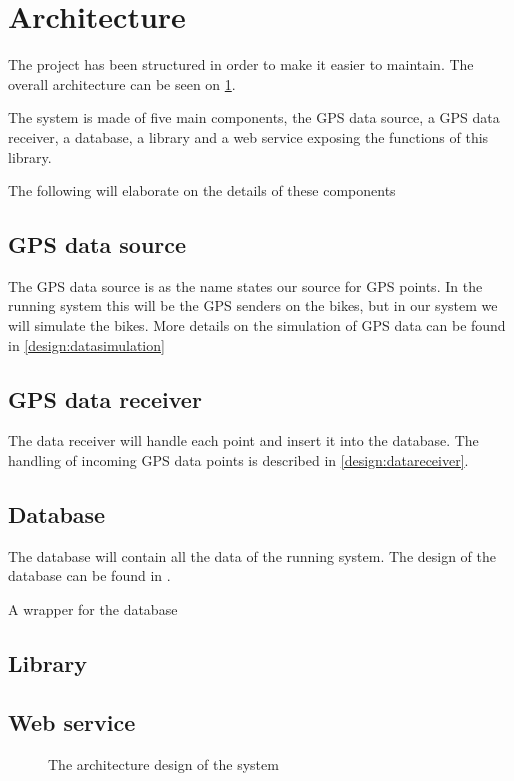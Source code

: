 \section{Architecture}

The project has been structured in order to make it easier to maintain. 
The overall architecture can be seen on \cref{arch}.

The system is made of five main components, the GPS data source, a GPS data receiver, a database, a library and a web service exposing the functions of this library.

The following will elaborate on the details of these components

\subsection{GPS data source}
The GPS data source is as the name states our source for GPS points.
In the running system this will be the GPS senders on the bikes, but in our system we will simulate the bikes.
More details on the simulation of GPS data can be found in \cref{design:datasimulation}

\subsection{GPS data receiver}
The data receiver will handle each point and insert it into the database. 
The handling of incoming GPS data points is described in \cref{design:datareceiver}.

\subsection{Database}
The database will contain all the data of the running system.
The design of the database can be found in .

A wrapper for the database 

\subsection{Library}

\subsection{Web service}


\begin{figure}[h]
\center

\caption{The architecture design of the system}
\label{arch}
\end{figure}